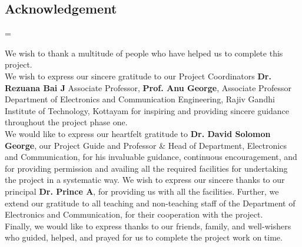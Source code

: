 
\begin{center}

    \vspace{6pt}
    \vspace{20pt}

    \begin{minipage} {0.9\textwidth}

        \chapter*{Acknowledgement}


        \setlength{\parindent}{10pt}
        \setlength{\parskip}{10pt}

        \emergencystretch=\maxdimen

        \noindent We wish to thank a multitude of people who have helped us to
        complete this project.
        \\


        \noindent We wish to express our sincere gratitude to our Project
        Coordinators \textbf{Dr. Rezuana Bai J} Associate Professor,
        \textbf{Prof. Anu George}, Associate Professor Department of
        Electronics and Communication Engineering, Rajiv Gandhi Institute of
        Technology, Kottayam for inspiring and providing sincere guidance
        throughout the project phase one.
        \\


        \noindent We would like to express our heartfelt gratitude to
        \textbf{Dr. David Solomon George}, our Project Guide and Professor \&
        Head of Department, Electronics and Communication, for his invaluable
        guidance, continuous encouragement, and for providing permission and
        availing all the required facilities for undertaking the project in a
        systematic way. We wish to express our sincere thanks to our principal
        \textbf{Dr. Prince A}, for providing us with all the facilities.
        Further, we extend our gratitude to all teaching and non-teaching staff
        of the Department of Electronics and Communication, for their
        cooperation with the project.
        \\


        \noindent Finally, we would like to express thanks to our friends,
        family, and well-wishers who guided, helped, and prayed for us to
        complete the project work on time.

    \end{minipage}

\end{center}

\pagebreak
